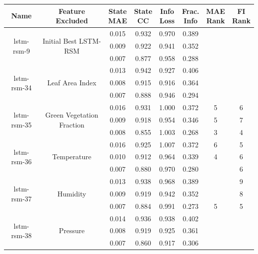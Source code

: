 \begin{table}[H]
\centering
    \small
    \begin{tabular}{c|c|c|c|c|c|c|c }
    Name & \thead{Feature \\ Excluded} &  \thead{State\\MAE} & \thead{State\\CC} & \thead{Info\\Loss} &\thead{Frac.\\Info} &\thead{MAE\\Rank} &\thead{FI\\Rank} \\
\hline
        \multirow{3}{6em}{lstm-rsm-9} & \multirow{3}{8em}{Initial Best LSTM-RSM} & 0.015 & 0.932 & 0.970 & 0.389 & & \\ & & 0.009 & 0.922 & 0.941 & 0.352 & & \\ & & 0.007 & 0.877 & 0.958 & 0.288 & & \\
\hline
        \multirow{3}{6em}{lstm-rsm-34} & \multirow{3}{8em}{Leaf Area Index} & 0.013 & 0.942 & 0.927 & 0.406 & & \\ & & 0.008 & 0.915 & 0.916 & 0.364 & & \\ & & 0.007 & 0.888 & 0.946 & 0.294 & & \\
\hline
        \multirow{3}{6em}{lstm-rsm-35} & \multirow{3}{8em}{Green Vegetation Fraction} & 0.016 & 0.931 & 1.000 & 0.372 & 5 & 6 \\ & & 0.009 & 0.918 & 0.954 & 0.346 & 5 & 7 \\ & & 0.008 & 0.855 & 1.003 & 0.268 & 3 & 4 \\
\hline
        \multirow{3}{6em}{lstm-rsm-36} & \multirow{3}{8em}{Temperature} & 0.016 & 0.925 & 1.007 & 0.372 & 6 & 5 \\ & & 0.010 & 0.912 & 0.964 & 0.339 & 4 & 6 \\ & & 0.007 & 0.880 & 0.970 & 0.280 & & 6 \\
\hline
        \multirow{3}{6em}{lstm-rsm-37} & \multirow{3}{8em}{Humidity} & 0.013 & 0.938 & 0.968 & 0.389 & & 9 \\ & & 0.009 & 0.919 & 0.942 & 0.352 & & 8 \\ & & 0.007 & 0.884 & 0.991 & 0.273 & 5 & 5 \\
\hline
        \multirow{3}{6em}{lstm-rsm-38} & \multirow{3}{8em}{Pressure} & 0.014 & 0.936 & 0.938 & 0.402 & & \\ & & 0.008 & 0.919 & 0.925 & 0.361 & & \\ & & 0.007 & 0.860 & 0.917 & 0.306 & & \\

\end{tabular}
\end{table}
